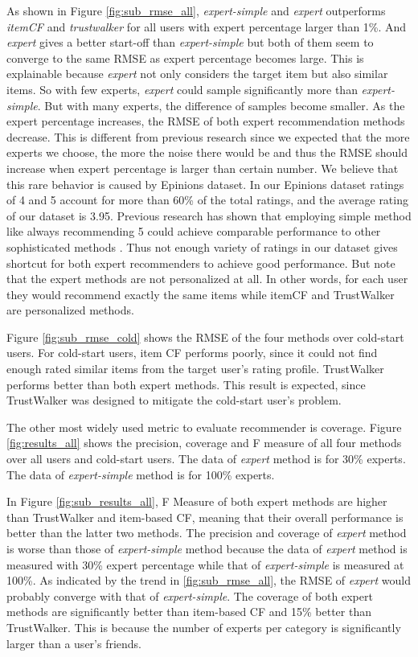 \documentclass[12pt]{article}
\begin{document}
As shown in Figure \ref{fig:sub_rmse_all}, \emph{expert-simple} and \emph{expert} outperforms \emph{itemCF} and \emph{trustwalker} for all users with expert percentage larger than 1\%. And \emph{expert} gives a better start-off than \emph{expert-simple} but both of them seem to converge to the same RMSE as expert percentage becomes large. This is explainable because \emph{expert} not only considers the target item but also similar items. So with few experts, \emph{expert} could sample significantly more than \emph{expert-simple}. But with many experts, the difference of samples become smaller. As the expert percentage increases, the RMSE of both expert recommendation methods decrease. This is different from previous research \cite{Sarwar:2001p433} since we expected that the more experts we choose, the more the noise there would be and thus the RMSE should increase when expert percentage is larger than certain number. We believe that this rare behavior is caused by Epinions dataset. In our Epinions dataset ratings of 4 and 5 account for more than 60\% of the total ratings, and the average rating of our dataset is 3.95. Previous research has shown that employing simple method like always recommending 5 could achieve comparable performance to other sophisticated methods \cite{Massa:2007p437}. Thus not enough variety of ratings in our dataset gives shortcut for both expert recommenders to achieve good performance. But note that the expert methods are not personalized at all. In other words, for each user they would recommend exactly the same items while itemCF and TrustWalker are personalized methods.


Figure \ref{fig:sub_rmse_cold} shows the RMSE of the four methods over cold-start users. For cold-start users, item CF performs poorly, since it could not find enough rated similar items from the target user's rating profile. TrustWalker performs better than both expert methods. This result is expected, since TrustWalker was designed to mitigate the cold-start user's problem.


The other most widely used metric to evaluate recommender is coverage. Figure \ref{fig:results_all} shows the precision, coverage and F measure of all four methods over all users and cold-start users. The data of \emph{expert} method is for 30\% experts. The data of \emph{expert-simple} method is for 100\% experts.

In Figure \ref{fig:sub_results_all}, F Measure of both expert methods are higher than TrustWalker and item-based CF, meaning that their overall performance is better than the latter two methods. The precision and coverage of \emph{expert} method is worse than those of \emph{expert-simple} method because the data of \emph{expert} method is measured with 30\% expert percentage while that of \emph{expert-simple} is measured at 100\%. As indicated by the trend in \ref{fig:sub_rmse_all}, the RMSE of \emph{expert} would probably converge with that of \emph{expert-simple}. The coverage of both expert methods are significantly better than item-based CF and 15\% better than TrustWalker. This is because the number of experts per category is significantly larger than a user's friends.
\end{document}
